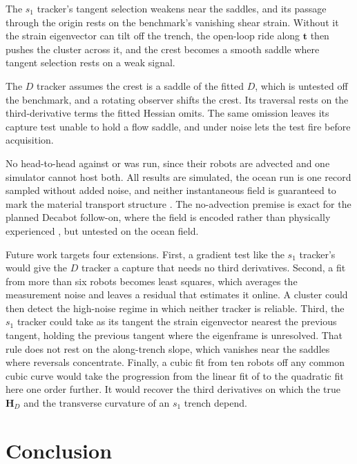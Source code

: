 \documentclass[lettersize,journal]{IEEEtran}
\begin{document}
The $s_1$ tracker's tangent selection weakens near the saddles, and its
passage through the origin rests on the benchmark's vanishing shear
strain. Without it the strain eigenvector
can tilt off the trench, the open-loop ride along $\mathbf{t}$ then
pushes the cluster across it, and the crest becomes a smooth saddle where
tangent selection rests on a weak signal.

The $D$ tracker assumes the crest is a saddle of the fitted $D$, which is
untested off the benchmark, and a rotating observer shifts the crest. Its
traversal rests on the third-derivative terms the fitted Hessian omits.
The same omission leaves its capture test unable to hold a flow saddle,
and under noise lets the test fire before acquisition.

No head-to-head against \cite{26,27,28} or \cite{29} was run, since
their robots are advected and one simulator cannot host both. All results
are simulated, the ocean run is one record sampled without added noise,
and neither instantaneous field is guaranteed to mark the material
transport structure \cite{18}. The no-advection premise is exact for the
planned Decabot follow-on, where the field is encoded rather than
physically experienced \cite{32}, but untested on the ocean field.

Future work targets four extensions. First, a gradient test like the
$s_1$ tracker's would give the $D$ tracker a capture that needs no third
derivatives. Second, a fit from more than six robots becomes least squares,
which averages the measurement noise and leaves a residual that estimates
it online. A cluster could then detect the high-noise regime in which neither
tracker is reliable. Third, the
$s_1$ tracker could take as its tangent the strain eigenvector nearest the
previous tangent, holding the previous tangent where the eigenframe is
unresolved. That rule does not rest on the along-trench slope, which
vanishes near the saddles where reversals concentrate. Finally, a cubic fit
from ten robots off any common cubic curve would take the progression from
the linear fit of \cite{10} to the quadratic fit here one order further. It
would recover the third derivatives on which the true $\mathbf{H}_D$ and
the transverse curvature of an $s_1$ trench depend.

\section{Conclusion}
\end{document}
